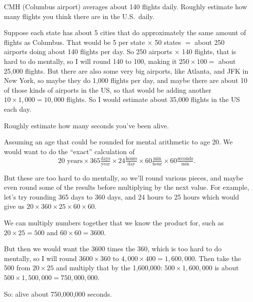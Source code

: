 \documentclass[12pt]{ximera}
\begin{document}
\begin{problem}
CMH (Columbus airport) averages about 140 flights daily. Roughly estimate how many
flights you think there are in the U.S.\ daily.

\begin{freeResponse}
\end{freeResponse}

\begin{solution}
Suppose each state has about 5 cities that do approximately the same amount of flights
as Columbus. That would be 5 per state $\times$ 50 states $=$ about 250 airports doing
about 140 flights per day. So 250 airports $\times$ 140 flights, that is hard to do
mentally, so I will round 140 to 100, making it $250 \times 100 = $ about 25,000
flights. But there are also some very big airports, like Atlanta, and JFK in New York,
so maybe they do 1,000 flights per day, and maybe there are about 10 of those kinds of
airports in the US, so that would be adding another $10 \times 1{,}000 = 10{,}000$
flights. So I would estimate about 35,000 flights in the US each day.
\end{solution}
\end{problem}

\begin{problem}\label{problem:secondsAlive}
Roughly estimate how many seconds you've been alive.

\begin{freeResponse}
\end{freeResponse}

\begin{solution}
Assuming an age that could be rounded for mental arithmetic to age 20. We would want to
do the ``exact'' calculation of
\[
20 \text{ years} \times 365 \tfrac{\text{days}}{\text{year}}
\times 24 \tfrac{\text{hours}}{\text{day}}
\times 60 \tfrac{\text{min}}{\text{hour}}
\times 60 \tfrac{\text{seconds}}{\text{min}}.
\]

But these are too hard to do mentally, so we'll round various pieces, and maybe even
round some of the results before multiplying by the next value. For example, let's try
rounding 365 days to 360 days, and 24 hours to 25 hours which would give us
$20 \times 360 \times 25 \times 60 \times 60$.

We can multiply numbers together that we know the product for, such as
$20 \times 25 = 500$ and $60 \times 60 = 3600$.

But then we would want the 3600 times the 360, which is too hard to do mentally, so I
will round $3600 \times 360$ to $4{,}000 \times 400 = 1{,}600{,}000$. Then take the 500
from $20 \times 25$ and multiply that by the 1,600,000: $500 \times 1{,}600{,}000$ is
about $500 \times 1{,}500{,}000 = 750{,}000{,}000$.

So: alive about 750,000,000 seconds.
\end{solution}
\end{problem}
\end{document}
